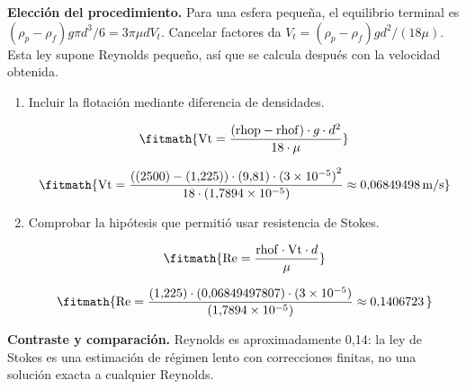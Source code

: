 \noindent\textbf{Elección del procedimiento.} Para una esfera pequeña, el equilibrio terminal es $(\rho_p-\rho_f)g\pi d^3/6=3\pi\mu dV_t$. Cancelar factores da $V_t=(\rho_p-\rho_f)gd^2/(18\mu)$. Esta ley supone Reynolds pequeño, así que se calcula después con la velocidad obtenida.

\begin{enumerate}

\item Incluir la flotación mediante diferencia de densidades.

\[\fitmath{\mathrm{Vt}=\frac{\left(\mathrm{rhop}-\mathrm{rhof}\right)\cdot g\cdot {d}^{2}}{18\cdot \mu}}\]

\[\fitmath{\mathrm{Vt}=\frac{\left((2500)-(1{,}225)\right)\cdot (9{,}81)\cdot {(3\times10^{-5})}^{2}}{18\cdot (1{,}7894\times10^{-5})}\approx 0{,}06849498\,\mathrm{m/s}}\]

\item Comprobar la hipótesis que permitió usar resistencia de Stokes.

\[\fitmath{\mathrm{Re}=\frac{\mathrm{rhof}\cdot \mathrm{Vt}\cdot d}{\mu}}\]

\[\fitmath{\mathrm{Re}=\frac{(1{,}225)\cdot (0{,}06849497807)\cdot (3\times10^{-5})}{(1{,}7894\times10^{-5})}\approx 0{,}1406723\,}\]

\end{enumerate}

\noindent\textbf{Contraste y comparación.} Reynolds es aproximadamente 0,14: la ley de Stokes es una estimación de régimen lento con correcciones finitas, no una solución exacta a cualquier Reynolds.
